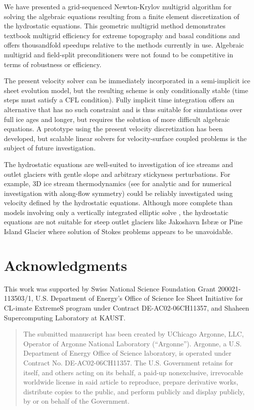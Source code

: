 \documentclass[draft,lineno,jgrga]{AGUTeX}
\begin{document}
\begin{article}
We have presented a grid-sequenced Newton-Krylov multigrid algorithm for solving the algebraic equations resulting from a finite element discretization of the hydrostatic equations.
This geometric multigrid method demonstrates textbook multigrid efficiency for extreme topography and basal conditions and offers thousandfold speedups relative to the methods currently in use.
Algebraic multigrid and field-split preconditioners were not found to be competitive in terms of robustness or efficiency.

The present velocity solver can be immediately incorporated in a semi-implicit ice sheet evolution model, but the resulting scheme is only conditionally stable (time steps must satisfy a CFL condition).
Fully implicit time integration offers an alternative that has no such constraint and is thus suitable for simulations over full ice ages and longer, but requires the solution of more difficult algebraic equations.
A prototype using the present velocity discretization has been developed, but scalable linear solvers for velocity-surface coupled problems is the subject of future investigation.

The hydrostatic equations are well-suited to investigation of ice streams and outlet glaciers with gentle slope and arbitrary stickyness perturbations.
For example, 3D ice stream thermodynamics (see \cite{raymond2000energy} for analytic and \cite{truffer2003isbrae} for numerical investigation with along-flow symmetry) could be reliably investigated using velocity defined by the hydrostatic equations.
Although more complete than models involving only a vertically integrated elliptic solve \citep[e.g.][]{bueler2009shallow,goldberg2009grounding,goldberg2010variational}, the hydrostatic equations are not suitable for steep outlet glaciers like Jakoshavn Isbr{\ae} or Pine Island Glacier where solution of Stokes problems appears to be unavoidable.

\section*{Acknowledgments}
This work was supported by Swiss National Science Foundation Grant 200021-113503/1, U.S. Department of Energy's Office of Science Ice Sheet Initiative for CL-imate ExtremeS program under Contract DE-AC02-06CH11357, and Shaheen Supercomputing Laboratory at KAUST.




\bigskip
\begin{quotation}
The submitted manuscript has been created by UChicago Argonne, LLC,
Operator of Argonne National Laboratory (``Argonne'').  Argonne, a
U.S. Department of Energy Office of Science laboratory, is operated
under Contract No. DE-AC02-06CH11357.  The U.S. Government retains for
itself, and others acting on its behalf, a paid-up nonexclusive,
irrevocable worldwide license in said article to reproduce, prepare
derivative works, distribute copies to the public, and perform
publicly and display publicly, by or on behalf of the Government.
\end{quotation}

\end{article}
\end{document}
